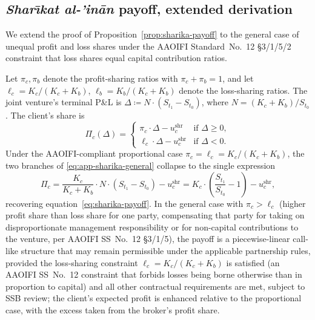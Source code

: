 \documentclass[preprint,12pt,authoryear]{elsarticle}
\theoremstyle{definition}
\begin{document}
\subsection{\emph{Shar\={\i}kat al-'in\={a}n} payoff, extended
derivation}
\label{app:sharika}

We extend the proof of Proposition~\ref{prop:sharika-payoff} to
the general case of unequal profit and loss shares under the
AAOIFI Standard~No.~12 \S3/1/5/2 constraint that loss shares
equal capital contribution ratios.

Let $\pi_c, \pi_b$ denote the profit-sharing ratios with
$\pi_c + \pi_b = 1$, and let $\ell_c = K_c / (K_c + K_b)$,
$\ell_b = K_b / (K_c + K_b)$ denote the loss-sharing ratios.
The joint venture's terminal P\&L is
$\Delta \coloneqq N \cdot (S_{t_1} - S_{t_0})$, where
$N = (K_c + K_b) / S_{t_0}$. The client's share is
\begin{equation}
    \Pi_c(\Delta)
    = \begin{cases}
        \pi_c \cdot \Delta - u^{\text{shr}}_c
            & \text{if } \Delta \geq 0, \\
        \ell_c \cdot \Delta - u^{\text{shr}}_c
            & \text{if } \Delta < 0.
      \end{cases}
    \label{eq:app-sharika-general}
\end{equation}
Under the AAOIFI-compliant proportional case
$\pi_c = \ell_c = K_c / (K_c + K_b)$, the two branches of
\eqref{eq:app-sharika-general} collapse to the single expression
\begin{equation}
    \Pi_c
    = \frac{K_c}{K_c + K_b} \cdot N \cdot (S_{t_1} - S_{t_0})
      - u^{\text{shr}}_c
    = K_c \cdot \left( \frac{S_{t_1}}{S_{t_0}} - 1 \right)
      - u^{\text{shr}}_c,
    \label{eq:app-sharika-proportional}
\end{equation}
recovering equation~\eqref{eq:sharika-payoff}. In the general
case with $\pi_c > \ell_c$ (higher profit share than loss share
for one party, compensating that party for taking on
disproportionate management responsibility or for
non-capital contributions to the venture, per AAOIFI SS~No.~12
\S3/1/5), the payoff is a piecewise-linear call-like structure
that may remain permissible under the applicable partnership
rules, provided the loss-sharing constraint $\ell_c = K_c /
(K_c + K_b)$ is satisfied (an AAOIFI SS~No.~12 constraint that
forbids losses being borne otherwise than in proportion to
capital) and all other contractual requirements are met,
subject to SSB review; the client's expected profit is enhanced
relative to the proportional case, with the excess taken from
the broker's profit share.
\end{document}
